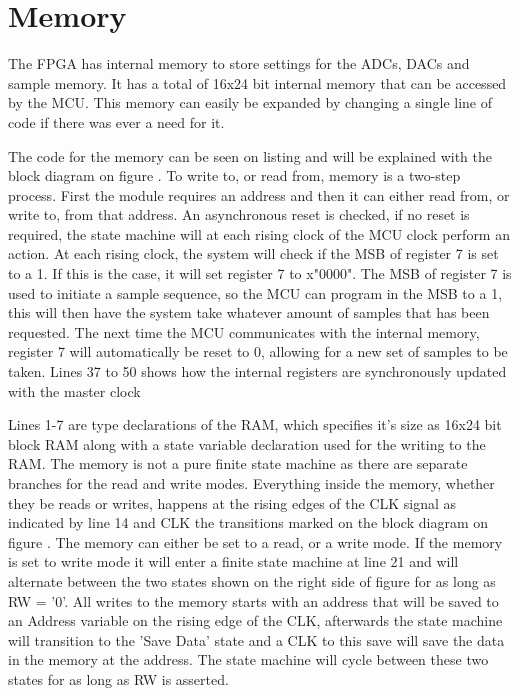 \section{Memory} \label{subsec:Memory}
The FPGA has internal memory to store settings for the ADCs, DACs and sample memory. It has a total of 16x24 bit internal memory that can be accessed by the MCU. This memory can easily be expanded by changing a single line of code if there was ever a need for it.

The code for the memory can be seen on listing  and will be explained with the block diagram on figure . To write to, or read from, memory is a two-step process. First the module requires an address and then it can either read from, or write to, from that address. An asynchronous reset is checked, if no reset is required, the state machine will at each rising clock of the MCU clock perform an action. At each rising clock, the system will check if the MSB of register 7 is set to a 1. If this is the case, it will set register 7 to x"0000". The MSB of register 7 is used to initiate a sample sequence, so the MCU can program in the MSB to a 1, this will then have the system take whatever amount of samples that has been requested. The next time the MCU communicates with the internal memory, register 7 will automatically be reset to 0, allowing for a new set of samples to be taken. Lines 37 to 50 shows how the internal registers are synchronously updated with the  master clock



Lines 1-7 are type declarations of the RAM, which specifies it's size as 16x24 bit block RAM along with a state variable declaration used for the writing to the RAM. The memory is not a pure finite state machine as there are separate branches for the read and write modes. Everything inside the memory, whether they be reads or writes, happens at the rising edges of the CLK signal as indicated by line 14 and CLK the transitions marked on the block diagram on figure . The memory can either be set to a read, or a write mode. If the memory is set to write mode it will enter a finite state machine at line 21 and will alternate between the two states shown on the right side of figure  for as long as RW = '0'. All writes to the memory starts with an address that will be saved to an Address variable on the rising edge of the CLK, afterwards the state machine will transition to the 'Save Data' state and a CLK to this save will save the data in the memory at the address. The state machine will cycle between these two states for as long as RW is asserted. 




